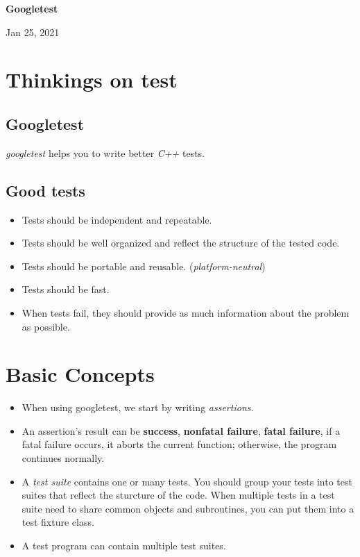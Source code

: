 \documentclass[letterpaper,11pt]{report}
\newcommand{\coursetopic}{Googletest}
\newcommand{\thedate}{Jan 25, 2021}
\begin{document}
\begin{center}{\huge \bfseries \coursetopic}\end{center}  %
\begin{flushright}\thedate\end{flushright} %

\section*{Thinkings on test}
\subsection*{Googletest}
\textit{googletest} helps you to write better \textit{C++} tests.
\subsection*{Good tests}
\begin{itemize}
    \item Tests should be independent and repeatable.
    \item Tests should be well organized and reflect the structure of the tested code.
    \item Tests should be portable and reusable. (\textit{platform-neutral})
    \item Tests should be fast.
    \item When tests fail, they should provide as much information about the problem as possible.
\end{itemize}

\section*{Basic Concepts}
\begin{itemize}
    \item When using googletest, we start by writing \textit{assertions}.
    \item An assertion's result can be \textbf{success}, \textbf{nonfatal failure}, \textbf{fatal failure},
if a fatal failure occurs, it aborts the current function; otherwise, the program continues normally.
    \item A \textit{test suite} contains one or many tests. You should group your tests into test suites that reflect 
the sturcture of the code. When multiple tests in a test suite need to share common objects and subroutines,
you can put them into a test fixture class.
    \item A test program can contain multiple test suites.
\end{itemize}
\end{document}
